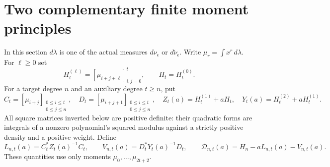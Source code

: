 \documentclass[11pt]{article}
\begin{document}
\section{Two complementary finite moment principles}

In this section $d\lambda$ is one of the actual measures
$d\nu_\epsilon$ or $d\widetilde\nu_\epsilon$.  Write
$\mu_r=\int x^r\,d\lambda$.  For $\ell\ge0$ set
\[
 H_t^{(\ell)}=[\mu_{i+j+\ell}]_{i,j=0}^t,
 \qquad H_t=H_t^{(0)}.
\]
For a target degree $n$ and an auxiliary degree $t\ge n$, put
\begin{equation}\label{eq:rectangular}
 C_t=[\mu_{i+j}]_{\substack{0\le i\le t\\0\le j\le n}},
 \quad D_t=[\mu_{i+j+1}]_{\substack{0\le i\le t\\0\le j\le n}},
 \quad Z_t(a)=H_t^{(1)}+aH_t,
 \quad Y_t(a)=H_t^{(2)}+aH_t^{(1)}.
\end{equation}
All square matrices inverted below are positive definite: their
quadratic forms are integrals of a nonzero polynomial's squared
modulus against a strictly positive density and a positive weight.
Define
\begin{equation}\label{eq:variational}
 L_{n,t}(a)=C_t^*Z_t(a)^{-1}C_t,
 \qquad V_{n,t}(a)=D_t^*Y_t(a)^{-1}D_t,
 \qquad\mathcal D_{n,t}(a)=H_n-aL_{n,t}(a)-V_{n,t}(a).
\end{equation}
These quantities use only moments $\mu_0,\ldots,\mu_{2t+2}$.
\end{document}
